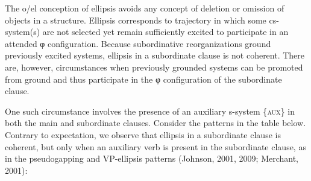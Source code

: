   The o/el conception of ellipsis avoids any concept of deletion or omission of objects in a structure. Ellipsis corresponds to trajectory in which some cs-system(s) are not selected yet remain sufficiently excited to participate in an attended φ configuration. Because subordinative reorganizations ground previously excited systems, ellipsis in a subordinate clause is not coherent. There are, however, circumstances when previously grounded systems can be promoted from ground and thus participate in the φ configuration of the subordinate clause. 

  One such circumstance involves the presence of an auxiliary s-system \{\textsc{aux}\} in both the main and subordinate clauses. Consider the patterns in the table below. Contrary to expectation, we observe that ellipsis in a subordinate clause is coherent, but only when an auxiliary verb is present in the subordinate clause, as in the pseudogapping and VP-ellipsis patterns (Johnson, 2001, 2009; Merchant, 2001):

